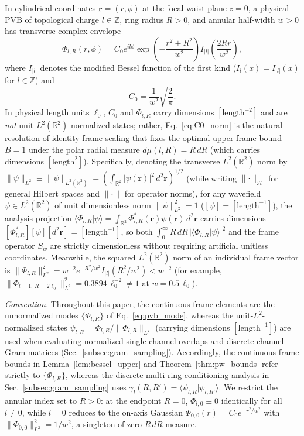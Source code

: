 \documentclass[aps,pra,reprint,nofootinbib,floatfix,longbibliography]{revtex4-2}
\theoremstyle{remark}
\newcommand{\braket}[2]{\langle #1 | #2 \rangle}
\newcommand{\norm}[1]{\lVert #1 \rVert}
\newcommand{\abs}[1]{\lvert #1 \rvert}
\begin{document}
In cylindrical coordinates $\mathbf{r} = (r,\phi)$ at the focal waist plane $z = 0$, a physical PVB of topological charge $l \in \mathbb{Z}$, ring radius $R > 0$, and annular half-width $w > 0$ has transverse complex envelope~\cite{Ostrovsky2013,Vaity2015}
\begin{equation}
\Phi_{l,R}(r,\phi) = C_0 e^{il\phi} \exp\!\left(-\frac{r^2 + R^2}{w^2}\right) I_{\abs{l}}\!\left(\frac{2Rr}{w^2}\right),
\label{eq:pvb_mode}
\end{equation}
where $I_{\abs{l}}$ denotes the modified Bessel function of the first kind ($I_l(x) = I_{\abs{l}}(x)$ for $l \in \mathbb{Z}$) and
\begin{equation}
C_0 = \frac{1}{w^2}\sqrt{\frac{2}{\pi}}.
\label{eq:C0_norm}
\end{equation}
In physical length units $\ell_0$, $C_0$ and $\Phi_{l,R}$ carry dimensions $[\mathrm{length}^{-2}]$ and are \emph{not} unit-$L^2(\mathbb{R}^2)$-normalized states; rather, Eq.~\eqref{eq:C0_norm} is the natural resolution-of-identity frame scaling that fixes the optimal upper frame bound $B = 1$ under the polar radial measure $d\mu(l,R) = R\,dR$ (which carries dimensions $[\mathrm{length}^2]$). Specifically, denoting the transverse $L^2(\mathbb{R}^2)$ norm by $\norm{\psi}_{L^2} \equiv \norm{\psi}_{L^2(\mathbb{R}^2)} = (\int_{\mathbb{R}^2}\abs{\psi(\mathbf{r})}^2\,d^2\mathbf{r})^{1/2}$ (while writing $\norm{\cdot}_{\mathcal{H}}$ for general Hilbert spaces and $\norm{\cdot}$ for operator norms), for any wavefield $\psi \in L^2(\mathbb{R}^2)$ of unit dimensionless norm $\norm{\psi}_{L^2}^2 = 1$ ($[\psi] = [\mathrm{length}^{-1}]$), the analysis projection $\braket{\Phi_{l,R}}{\psi} = \int_{\mathbb{R}^2}\Phi_{l,R}^*(\mathbf{r})\psi(\mathbf{r})\,d^2\mathbf{r}$ carries dimensions $[\Phi_{l,R}^*][\psi][d^2\mathbf{r}] = [\mathrm{length}^{-1}]$, so both $\int_0^\infty R\,dR\,\abs{\braket{\Phi_{l,R}}{\psi}}^2$ and the frame operator $S_w$ are strictly dimensionless without requiring artificial unitless coordinates. Meanwhile, the squared $L^2(\mathbb{R}^2)$ norm of an individual frame vector is $\norm{\Phi_{l,R}}_{L^2}^2 = w^{-2} e^{-R^2/w^2} I_{\abs{l}}(R^2/w^2) < w^{-2}$ (for example, $\norm{\Phi_{l=1,\,R=2\ell_0}}_{L^2}^2 = 0.3894\,\ell_0^{-2} \neq 1$ at $w = 0.5\,\ell_0$).

\emph{Convention.} Throughout this paper, the continuous frame elements are the unnormalized modes $\{\Phi_{l,R}\}$ of Eq.~\eqref{eq:pvb_mode}, whereas the unit-$L^2$-normalized states $\psi_{l,R} = \Phi_{l,R}/\norm{\Phi_{l,R}}_{L^2}$ (carrying dimensions $[\mathrm{length}^{-1}]$) are used when evaluating normalized single-channel overlaps and discrete channel Gram matrices (Sec.~\ref{subsec:gram_sampling}). Accordingly, the continuous frame bounds in Lemma~\ref{lem:bessel_upper} and Theorem~\ref{thm:pw_bounds} refer strictly to $\{\Phi_{l,R}\}$, whereas the discrete multi-ring conditioning analysis in Sec.~\ref{subsec:gram_sampling} uses $\gamma_l(R,R') = \braket{\psi_{l,R}}{\psi_{l,R'}}$. We restrict the annular index set to $R > 0$: at the endpoint $R = 0$, $\Phi_{l,0} \equiv 0$ identically for all $l \neq 0$, while $l = 0$ reduces to the on-axis Gaussian $\Phi_{0,0}(r) = C_0 e^{-r^2/w^2}$ with $\norm{\Phi_{0,0}}_{L^2}^2 = 1/w^2$, a singleton of zero $R\,dR$ measure.
\end{document}
